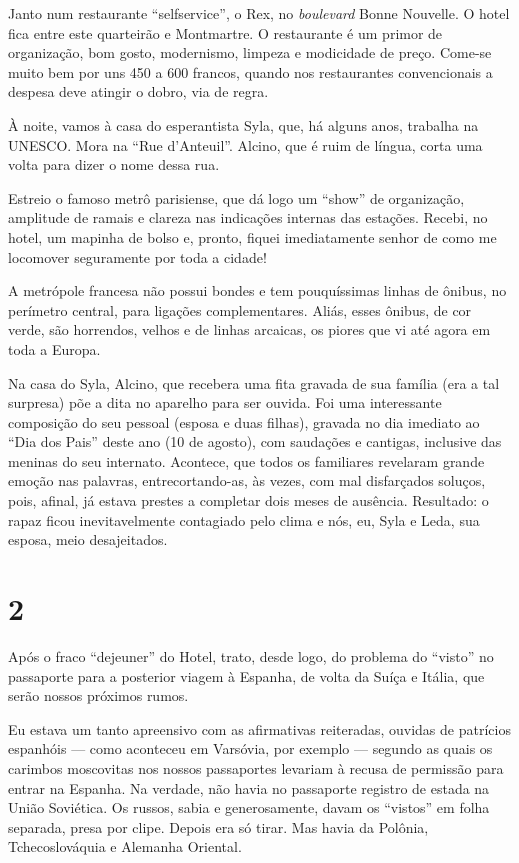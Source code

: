 Janto num restaurante ``selfservice'', o Rex, no \textit{boulevard} Bonne Nouvelle. O hotel fica entre este quarteirão e Montmartre. O restaurante é um primor de organização, bom gosto, modernismo, limpeza e modicidade de preço. Come-se muito bem por uns 450 a 600 francos, quando nos restaurantes convencionais a despesa deve atingir o dobro, via de regra.

À noite, vamos à casa do esperantista Syla, que, há alguns anos, trabalha na UNESCO. Mora na ``Rue d’Anteuil''. Alcino, que é ruim de língua, corta uma volta para dizer o nome dessa rua.

Estreio o famoso metrô parisiense, que dá logo um ``show'' de organização, amplitude de ramais e clareza nas indicações internas das estações. Recebi, no hotel, um mapinha de bolso e, pronto, fiquei imediatamente senhor de como me locomover seguramente por toda a cidade!

A metrópole francesa não possui bondes e tem pouquíssimas linhas de ônibus, no perímetro central, para ligações complementares. Aliás, esses ônibus, de cor verde, são horrendos, velhos e de linhas arcaicas, os piores que vi até agora em toda a Europa.

Na casa do Syla, Alcino, que recebera uma fita gravada de sua família (era a tal surpresa) põe a dita no aparelho para ser ouvida. Foi uma interessante composição do seu pessoal (esposa e duas filhas), gravada no dia imediato ao ``Dia dos Pais'' deste ano (10 de agosto), com saudações e cantigas, inclusive das meninas do seu internato. Acontece, que todos os familiares revelaram grande emoção nas palavras, entrecortando-as, às vezes, com mal disfarçados soluços, pois, afinal, já estava prestes a completar dois meses de ausência. Resultado: o rapaz ficou inevitavelmente contagiado pelo clima e nós, eu, Syla e Leda, sua esposa, meio desajeitados.

\section*{2 \adfflatleafright {}}
Após o fraco ``dejeuner'' do Hotel, trato, desde logo, do problema do ``visto'' no passaporte para a posterior viagem à Espanha, de volta da Suíça e Itália, que serão nossos próximos rumos.

Eu estava um tanto apreensivo com as afirmativas reiteradas, ouvidas de patrícios espanhóis --- como aconteceu em Varsóvia, por exemplo --- segundo as quais os carimbos moscovitas nos nossos passaportes levariam à recusa de permissão para entrar na Espanha. Na verdade, não havia no passaporte registro de estada na União Soviética. Os russos, sabia e generosamente, davam os ``vistos'' em folha separada, presa por clipe. Depois era só tirar. Mas havia da Polônia, Tchecoslováquia e Alemanha Oriental.

